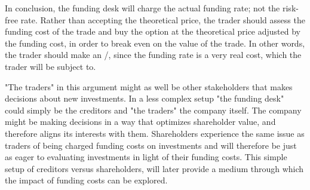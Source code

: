 \documentclass[main.tex]{subfiles}
\begin{document}
            In conclusion, the funding desk will charge the actual funding rate; not the risk-free rate.
            Rather than accepting the theoretical price, the trader should assess the funding cost of the trade 
            and buy the option at the theoretical price adjusted by the funding cost,
            in order to break even on the value of the trade.
            In other words, the trader should make an \FVA/, 
            since the funding rate is a very real cost, which the trader will be subject to.
            
            "The traders" in this argument might as well be other stakeholders that makes decisions about new investments.
            In a less complex setup "the funding desk" could simply be the creditors and "the traders" the company itself.
            The company might be making decisions in a way that optimizes shareholder value,
            and therefore aligns its interests with them.
            Shareholders experience the same issue as traders of being charged funding costs on investments 
            and will therefore be just as eager to evaluating investments in light of their funding costs.
            This simple setup of creditors versus shareholders, 
            will later provide a medium through which the impact of funding costs can be explored.
\end{document}

